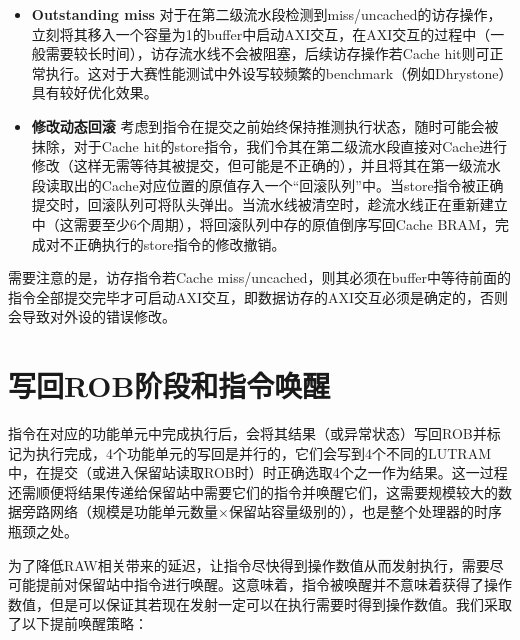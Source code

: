 \begin{itemize}
    \item \textbf{Outstanding miss} \quad 对于在第二级流水段检测到miss/uncached的访存操作，立刻将其移入一个容量为1的buffer中启动AXI交互，在AXI交互的过程中（一般需要较长时间），访存流水线不会被阻塞，后续访存操作若Cache hit则可正常执行。这对于大赛性能测试中外设写较频繁的benchmark（例如Dhrystone）具有较好优化效果。
    \item \textbf{修改动态回滚} \quad 考虑到指令在提交之前始终保持推测执行状态，随时可能会被抹除，对于Cache hit的store指令，我们令其在第二级流水段直接对Cache进行修改（这样无需等待其被提交，但可能是不正确的），并且将其在第一级流水段读取出的Cache对应位置的原值存入一个“回滚队列”中。当store指令被正确提交时，回滚队列可将队头弹出。当流水线被清空时，趁流水线正在重新建立中（这需要至少6个周期），将回滚队列中存的原值倒序写回Cache BRAM，完成对不正确执行的store指令的修改撤销。
\end{itemize}

需要注意的是，访存指令若Cache miss/uncached，则其必须在buffer中等待前面的指令全部提交完毕才可启动AXI交互，即数据访存的AXI交互必须是确定的，否则会导致对外设的错误修改。

\section{写回ROB阶段和指令唤醒}

指令在对应的功能单元中完成执行后，会将其结果（或异常状态）写回ROB并标记为执行完成，4个功能单元的写回是并行的，它们会写到4个不同的LUTRAM中，在提交（或进入保留站读取ROB时）时正确选取4个之一作为结果。这一过程还需顺便将结果传递给保留站中需要它们的指令并唤醒它们，这需要规模较大的数据旁路网络（规模是功能单元数量$\times$保留站容量级别的），也是整个处理器的时序瓶颈之处。

为了降低RAW相关带来的延迟，让指令尽快得到操作数值从而发射执行，需要尽可能提前对保留站中指令进行唤醒。这意味着，指令被唤醒并不意味着获得了操作数值，但是可以保证其若现在发射一定可以在执行需要时得到操作数值。我们采取了以下提前唤醒策略：


